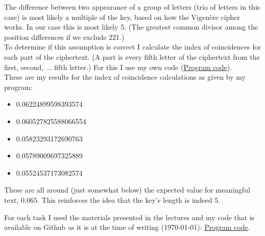 \documentclass{article}
\begin{document}
\begin{enumerate}[label={}]
\begin{itemize}
		\end{itemize}
		The difference between two appearance of a group of letters (trio of letters in this case) is most likely a multiple of the key, based on how the Vigenère cipher works. In our case this is most likely 5. (The greatest common divisor among the position differences if we exclude 221.)\\
		To determine if this assumption is correct I calculate the index of coincidences for each part of the ciphertext. (A part is every fifth letter of the ciphertext from the first, second, ... fifth letter.) For this I use my own code (\hyperlink{https://github.com/halkszavu/Encryption-Homework-2025/blob/main/Code/Homework-Calculations/Homework-Calculations/Program.cs}{Program code}).\\
		These are my results for the index of coincidence calculations as given by my program:
		\begin{itemize}		
			 \item  0.06224899598393574
			 \item  0.060527825588066554
			 \item  0.05823293172690763
			 \item  0.05789009697325889
			 \item  0.05524537173082574
		\end{itemize}
		These are all around (just somewhat below) the expected value for meaningful text, $0.065$. This reinforces the idea that the key's length is indeed 5.
\end{enumerate}

For each task I used the materials presented in the lectures and my code that is available on Github as it is at the time of writing (\today): \hyperlink{https://github.com/halkszavu/Encryption-Homework-2025/blob/main/Code/Homework-Calculations/Homework-Calculations/Program.cs}{Program code}.
\end{document}
